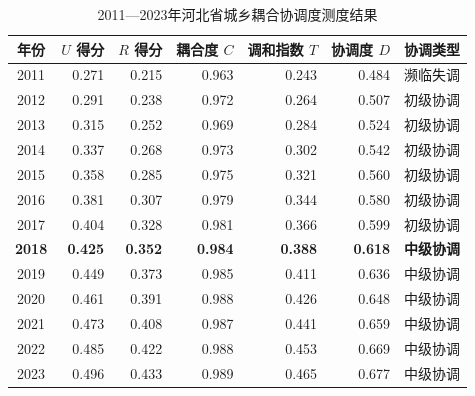 \documentclass[12pt, a4paper, twoside]{ctexart}
\begin{document}
\begin{table}[H]
  \centering
  \caption{2011—2023年河北省城乡耦合协调度测度结果}
  \label{tab:coupling}
  \begin{tabularx}{\linewidth}{c r
      r r
      r r X}
    \toprule
    \rowcolor{TableHead}
    \color{white}\bfseries 年份 &
    \color{white}\bfseries $U$ 得分 &
    \color{white}\bfseries $R$ 得分 &
    \color{white}\bfseries 耦合度 $C$ &
    \color{white}\bfseries 调和指数 $T$ &
    \color{white}\bfseries 协调度 $D$ &
    \color{white}\bfseries 协调类型 \\
    \midrule
    2011 & 0.271 & 0.215 & 0.963 & 0.243 & 0.484 & 濒临失调 \\
    \rowcolor{TableRow}
    2012 & 0.291 & 0.238 & 0.972 & 0.264 & 0.507 & 初级协调 \\
    2013 & 0.315 & 0.252 & 0.969 & 0.284 & 0.524 & 初级协调 \\
    \rowcolor{TableRow}
    2014 & 0.337 & 0.268 & 0.973 & 0.302 & 0.542 & 初级协调 \\
    2015 & 0.358 & 0.285 & 0.975 & 0.321 & 0.560 & 初级协调 \\
    \rowcolor{TableRow}
    2016 & 0.381 & 0.307 & 0.979 & 0.344 & 0.580 & 初级协调 \\
    2017 & 0.404 & 0.328 & 0.981 & 0.366 & 0.599 & 初级协调 \\
    \rowcolor{TableRow}
    \bfseries 2018 & \bfseries 0.425 & \bfseries 0.352 &
    \bfseries 0.984 & \bfseries 0.388 & \bfseries 0.618 &
    \bfseries 中级协调 \\
    2019 & 0.449 & 0.373 & 0.985 & 0.411 & 0.636 & 中级协调 \\
    \rowcolor{TableRow}
    2020 & 0.461 & 0.391 & 0.988 & 0.426 & 0.648 & 中级协调 \\
    2021 & 0.473 & 0.408 & 0.987 & 0.441 & 0.659 & 中级协调 \\
    \rowcolor{TableRow}
    2022 & 0.485 & 0.422 & 0.988 & 0.453 & 0.669 & 中级协调 \\
    2023 & 0.496 & 0.433 & 0.989 & 0.465 & 0.677 & 中级协调 \\
    \bottomrule
  \end{tabularx}
\end{table}
\end{document}

